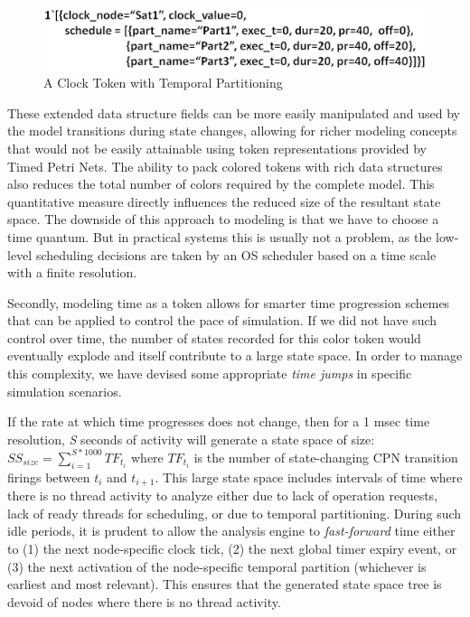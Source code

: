 \begin{figure}[h]
	\centering
	\includegraphics[width=\textwidth]{./img/clock}
	\caption{A Clock Token with Temporal Partitioning}
	\label{fig:clock}
\end{figure}

These extended data structure fields can be more easily manipulated and used by the model transitions during state changes, allowing for richer modeling concepts that would not be easily attainable using token representations provided by Timed Petri Nets. The ability to pack colored tokens with rich data structures also reduces the total number of colors required by the complete model. This quantitative measure directly influences the reduced size of the resultant state space. The downside of this approach to modeling is that we have to choose a time quantum. But in practical systems this is usually not a problem, as the low-level scheduling decisions are taken by an OS scheduler based on a time scale with a finite resolution. 

Secondly, modeling time as a token allows for smarter time progression schemes that can be applied to control the pace of simulation. If we did not have such control over time, the number of states recorded for this color token would eventually explode and itself contribute to a large state space. In order to manage this complexity, we have devised some appropriate \emph{time jumps} in specific simulation scenarios. 

If the rate at which time progresses does not change, then for a 1 msec time resolution, \emph{S} seconds of activity will generate a state space of size: $SS_{size} = \sum\limits_{i=1}^{S*1000} TF_{t_i}$ where $TF_{t_i}$ is the number of state-changing CPN transition firings between $t_i$ and $t_{i+1}$. This large state space includes intervals of time where there is no thread activity to analyze either due to lack of operation requests, lack of ready threads for scheduling, or due to temporal partitioning. During such idle periods, it is prudent to allow the analysis engine to \emph{fast-forward} time either to (1) the next node-specific clock tick, (2) the next global timer expiry event, or (3) the next activation of the node-specific temporal partition (whichever is earliest and most relevant). This ensures that the generated state space tree is devoid of nodes where there is no thread activity.

